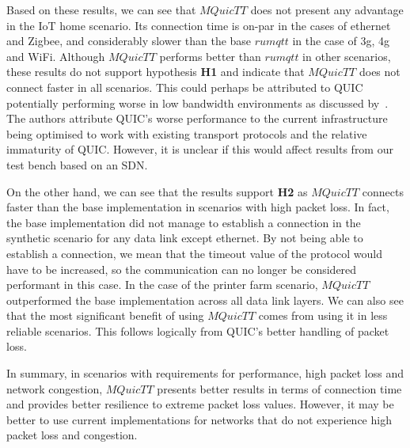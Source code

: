 Based on these results, we can see that $MQuicTT$ does not present any advantage in the IoT home scenario.
Its connection time is on-par in the cases of ethernet and Zigbee, and considerably slower than the base $rumqtt$ in the case of 3g, 4g and WiFi.
Although $MQuicTT$ performs better than $rumqtt$ in other scenarios, these results do not support hypothesis \textbf{H1} and indicate that $MQuicTT$ does not connect faster in all scenarios.
This could perhaps be attributed to QUIC potentially performing worse in low bandwidth environments as discussed by~\citet{Nepomuceno2018}.
The authors attribute QUIC's worse performance to the current infrastructure being optimised to work with existing transport protocols and the relative immaturity of QUIC.
However, it is unclear if this would affect results from our test bench based on an SDN.

On the other hand, we can see that the results support \textbf{H2} as $MQuicTT$ connects faster than the base implementation in scenarios with high packet loss.
In fact, the base implementation did not manage to establish a connection in the synthetic scenario for any data link except ethernet.
By not being able to establish a connection, we mean that the timeout value of the protocol would have to be increased, so the communication can no longer be considered performant in this case.
In the case of the printer farm scenario, $MQuicTT$ outperformed the base implementation across all data link layers.
We can also see that the most significant benefit of using $MQuicTT$ comes from using it in less reliable scenarios.
This follows logically from QUIC's better handling of packet loss.

In summary, in scenarios with requirements for performance, high packet loss and network congestion, $MQuicTT$ presents better results in terms of connection time and provides better resilience to extreme packet loss values.
However, it may be better to use current implementations for networks that do not experience high packet loss and congestion.
